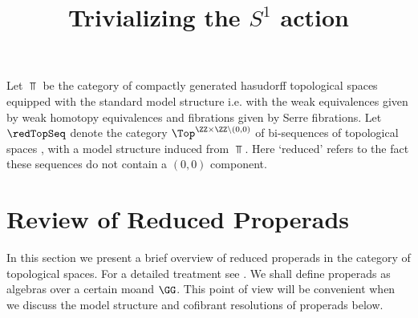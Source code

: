 \documentclass[a4paper,10pt]{amsart}
\title{Trivializing the $S^1$ action}
\begin{document}
\maketitle

\tableofcontents

Let $\Top$ be the category of compactly generated hasudorff topological spaces equipped with the standard model structure i.e.  with the weak equivalences given by weak homotopy equivalences and fibrations given by Serre fibrations. Let $\redTopSeq$ denote the category $\Top^{\ZZ \times \ZZ \setminus (0,0)}$ of bi-sequences of topological spaces , with a model structure induced from $\Top$. Here `reduced' refers to the fact these sequences do not contain a $(0,0)$ component.


\section{Review of Reduced Properads}
In this section we present a brief overview of reduced properads in the category of topological spaces. For a detailed treatment see \cite{vallette2007koszul}. We shall define properads as algebras over a certain moand $\GG$. This point of view will be convenient when we discuss the model structure and cofibrant resolutions of properads below.

\end{document}

